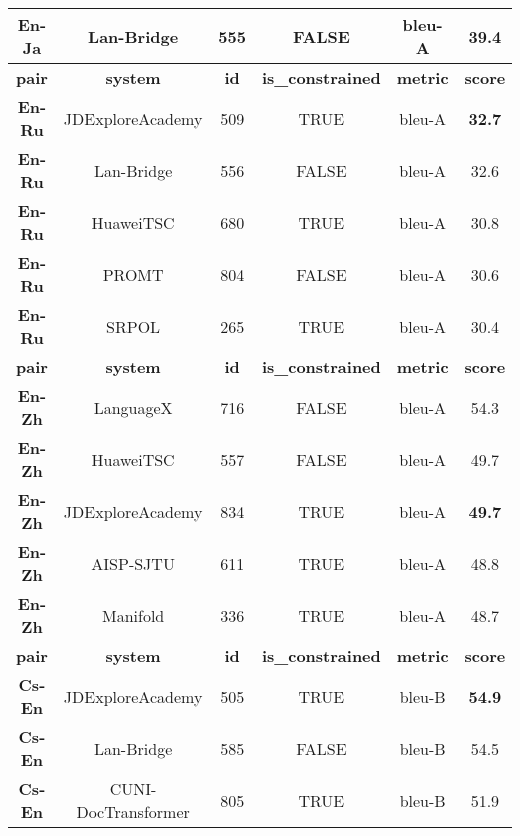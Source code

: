 \documentclass[11pt,a4paper]{article}
\begin{document}
\begin{table*}[t]
{\begin{tabular}{cccccc}
    \textbf{En-Ja} & Lan-Bridge          & 555         & FALSE                   & bleu-A          & 39.4           \\ \hline
    \textbf{pair}  & \textbf{system}     & \textbf{id} & \textbf{is\_constrained} & \textbf{metric} & \textbf{score} \\ \hline
    \textbf{En-Ru} & JDExploreAcademy    & 509         & TRUE                    & bleu-A          & \textbf{32.7}  \\
    \textbf{En-Ru} & Lan-Bridge          & 556         & FALSE                   & bleu-A          & 32.6           \\
    \textbf{En-Ru} & HuaweiTSC           & 680         & TRUE                    & bleu-A          & 30.8           \\
    \textbf{En-Ru} & PROMT               & 804         & FALSE                   & bleu-A          & 30.6           \\
    \textbf{En-Ru} & SRPOL               & 265         & TRUE                    & bleu-A          & 30.4           \\ \hline
    \textbf{pair}  & \textbf{system}     & \textbf{id} & \textbf{is\_constrained} & \textbf{metric} & \textbf{score} \\ \hline
    \textbf{En-Zh} & LanguageX           & 716         & FALSE                   & bleu-A          & 54.3           \\
    \textbf{En-Zh} & HuaweiTSC           & 557         & FALSE                   & bleu-A          & 49.7           \\
    \textbf{En-Zh} & JDExploreAcademy    & 834         & TRUE                    & bleu-A          & \textbf{49.7}  \\
    \textbf{En-Zh} & AISP-SJTU           & 611         & TRUE                    & bleu-A          & 48.8           \\
    \textbf{En-Zh} & Manifold            & 336         & TRUE                    & bleu-A          & 48.7           \\ \hline
    \textbf{pair}  & \textbf{system}     & \textbf{id} & \textbf{is\_constrained} & \textbf{metric} & \textbf{score} \\ \hline
    \textbf{Cs-En} & JDExploreAcademy    & 505         & TRUE                    & bleu-B          & \textbf{54.9}  \\
    \textbf{Cs-En} & Lan-Bridge          & 585         & FALSE                   & bleu-B          & 54.5           \\
    \textbf{Cs-En} & CUNI-DocTransformer & 805         & TRUE                    & bleu-B          & 51.9           \\

\end{tabular}}
\end{table*}
\end{document}
